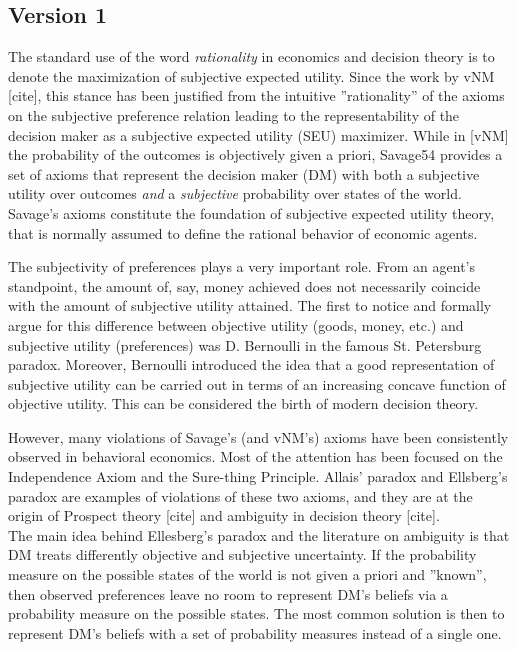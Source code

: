 \documentclass[fleqn,reqno,11pt]{article}
\begin{document}
\subsection{Version 1}

The standard use of the word \textit{rationality} in economics and decision theory is to denote the maximization of subjective expected utility. Since the work by vNM [cite], this stance has been justified from the intuitive ''rationality'' of the axioms on the subjective preference relation leading to the representability of the decision maker as a subjective expected utility (SEU) maximizer. 
While in [vNM] the probability of the outcomes is objectively given a priori, Savage54 provides a set of axioms that represent the decision maker (DM) with both a subjective utility over outcomes \textit{and} a \textit{subjective} probability over states of the world. Savage's axioms constitute the foundation of subjective expected utility theory, that is normally assumed to define the rational behavior of economic agents.


The subjectivity of preferences plays a very important
role. From an agent's standpoint, the amount of, say, money achieved does not necessarily
coincide with the amount of subjective utility attained. The first to notice and formally argue for this difference
between objective utility (goods, money, etc.) and subjective utility (preferences) was
D. Bernoulli in the famous St. Petersburg paradox. Moreover, Bernoulli introduced the idea that a good representation of
subjective utility can be carried out in terms of an increasing concave function of objective
utility. This can be considered the birth of modern decision theory.


However, many violations of Savage's (and vNM's) axioms have been consistently observed in behavioral economics. Most of the attention has been focused on the Independence Axiom and the Sure-thing Principle. Allais' paradox and Ellsberg's paradox are examples of violations of these two axioms, and they are at the origin of Prospect theory [cite] and ambiguity in decision theory [cite].\\

The main idea behind Ellesberg's paradox and the literature on ambiguity is that DM treats differently objective and subjective uncertainty. If the probability measure on the possible states of the world is not given a priori and ''known'', then observed preferences leave no room to represent  DM's beliefs via a probability measure on the possible states. The most common solution is then to represent DM's beliefs with a set of probability measures instead of a single one.  
\end{document}

